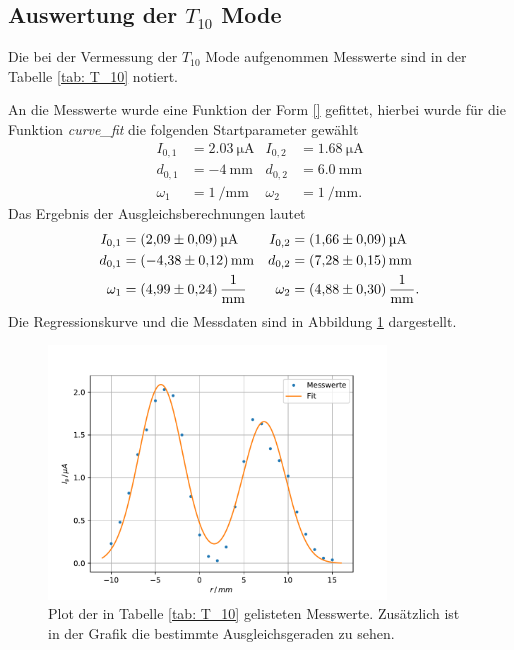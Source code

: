 \subsection{Auswertung der $T_{10}$ Mode}
\FloatBarrier
Die bei der Vermessung der $T_{10}$ Mode aufgenommen Messwerte sind in der Tabelle
\ref{tab: T_10} notiert.

An die Messwerte wurde eine Funktion der Form \eqref{} gefittet, hierbei wurde für
die Funktion \emph{curve\_fit} die folgenden Startparameter gewählt
\begin{align*}
  I_{0,1}&=\SI{2.03}{\micro\ampere} & I_{0,2}&=\SI{1.68}{\micro\ampere}\\
  d_{0,1}&=\SI{-4}{\milli\meter}& d_{0,2}&=\SI{6.0}{\milli\meter} \\
  \omega_1&=\SI{1}{\per\milli\meter} &   \omega_2&=\SI{1}{\per\milli\meter}.
\end{align*}
Das Ergebnis der Ausgleichsberechnungen lautet
\begin{align}
  \label{eq: fit_t_10}
  \begin{aligned}
  I_{0,1}&=\SI{2.09\pm0.09}{\micro\ampere} & I_{0,2}&=\SI{1.66\pm0.09}{\micro\ampere}\\
  d_{0,1}&=\SI{-4.38\pm0.12}{\milli\meter}& d_{0,2}&=\SI{7.28\pm0.15}{\milli\meter} \\
  \omega_1&=\SI{4.99\pm0.24}{\per\milli\meter} &   \omega_2&=\SI{4.88\pm0.30}{\per\milli\meter}.
\end{aligned}
\end{align}
Die Regressionskurve und die Messdaten sind in Abbildung \ref{fig: T_10} dargestellt.
\begin{figure}[h!]
  \centering
  \includegraphics[width=0.8\textwidth]{../Messdaten/plots/T_10.pdf}
  \caption{Plot der in Tabelle \ref{tab: T_10} gelisteten Messwerte. Zusätzlich ist in der Grafik die bestimmte Ausgleichsgeraden zu sehen.}
  \label{fig: T_10}
\end{figure}
\FloatBarrier

